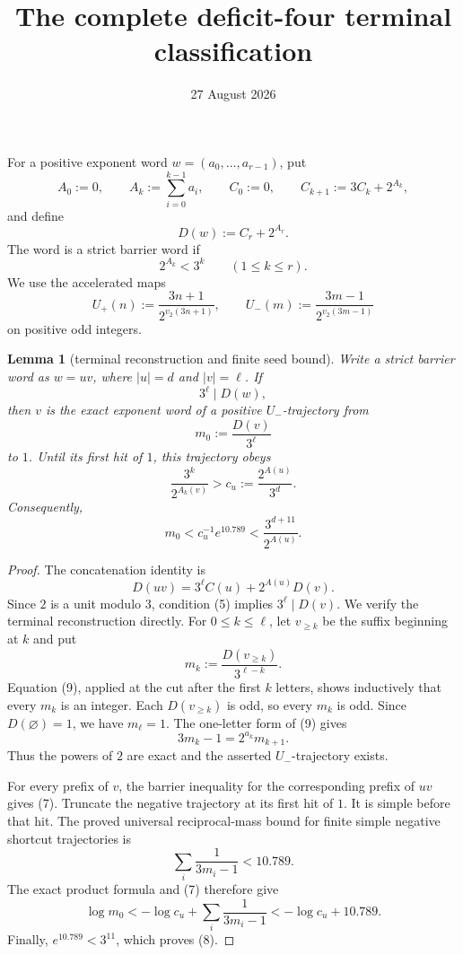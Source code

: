 \documentclass[11pt]{article}
\title{The complete deficit-four terminal classification}
\author{}
\date{27 August 2026}
\newtheorem{lemma}[theorem]{Lemma}
\newcommand{\Up}{U_+}
\newcommand{\Um}{U_-}
\begin{document}
\maketitle

For a positive exponent word $w=(a_0,\ldots,a_{r-1})$, put
\[
  A_0:=0,
  \qquad
  A_k:=\sum_{i=0}^{k-1}a_i,
  \qquad
  C_0:=0,
  \qquad
  C_{k+1}:=3C_k+2^{A_k},
  \tag{1}
\]
and define
\[
  D(w):=C_r+2^{A_r}.
  \tag{2}
\]
The word is a strict barrier word if
\[
  2^{A_k}<3^k
  \qquad(1\leq k\leq r).
  \tag{3}
\]
We use the accelerated maps
\[
  \Up(n):=\frac{3n+1}{2^{v_2(3n+1)}},
  \qquad
  \Um(m):=\frac{3m-1}{2^{v_2(3m-1)}}
  \tag{4}
\]
on positive odd integers.

\begin{lemma}[terminal reconstruction and finite seed bound]
Write a strict barrier word as $w=uv$, where $|u|=d$ and $|v|=\ell$.
If
\[
  3^\ell\mid D(w),
  \tag{5}
\]
then $v$ is the exact exponent word of a positive $\Um$-trajectory from
\[
  m_0:=\frac{D(v)}{3^\ell}
  \tag{6}
\]
to $1$.  Until its first hit of $1$, this trajectory obeys
\[
  \frac{3^k}{2^{A_k(v)}}>
  c_u:=\frac{2^{A(u)}}{3^d}.
  \tag{7}
\]
Consequently,
\[
\boxed{
  m_0<c_u^{-1}e^{10.789}
  <\frac{3^{d+11}}{2^{A(u)}}.}
\tag{8}
\]
\end{lemma}

\begin{proof}
The concatenation identity is
\[
  D(uv)=3^\ell C(u)+2^{A(u)}D(v).
  \tag{9}
\]
Since $2$ is a unit modulo $3$, condition (5) implies
$3^\ell\mid D(v)$.  We verify the terminal reconstruction directly.  For
$0\leq k\leq\ell$, let $v_{\geq k}$ be the suffix beginning at $k$ and put
\[
  m_k:=\frac{D(v_{\geq k})}{3^{\ell-k}}.
  \tag{10}
\]
Equation (9), applied at the cut after the first $k$ letters, shows
inductively that every $m_k$ is an integer.  Each $D(v_{\geq k})$ is odd,
so every $m_k$ is odd.  Since $D(\varnothing)=1$, we have $m_\ell=1$.
The one-letter form of (9) gives
\[
  3m_k-1=2^{a_k}m_{k+1}.
  \tag{11}
\]
Thus the powers of $2$ are exact and the asserted $\Um$-trajectory exists.

For every prefix of $v$, the barrier inequality for the corresponding
prefix of $uv$ gives (7).  Truncate the negative trajectory at its first hit
of $1$.  It is simple before that hit.  The proved universal reciprocal-mass
bound for finite simple negative shortcut trajectories is
\[
  \sum_i\frac1{3m_i-1}<10.789.
  \tag{12}
\]
The exact product formula and (7) therefore give
\[
  \log m_0
  <-\log c_u+\sum_i\frac1{3m_i-1}
  <-\log c_u+10.789.
\]
Finally, $e^{10.789}<3^{11}$, which proves (8).
\end{proof}
\end{document}
